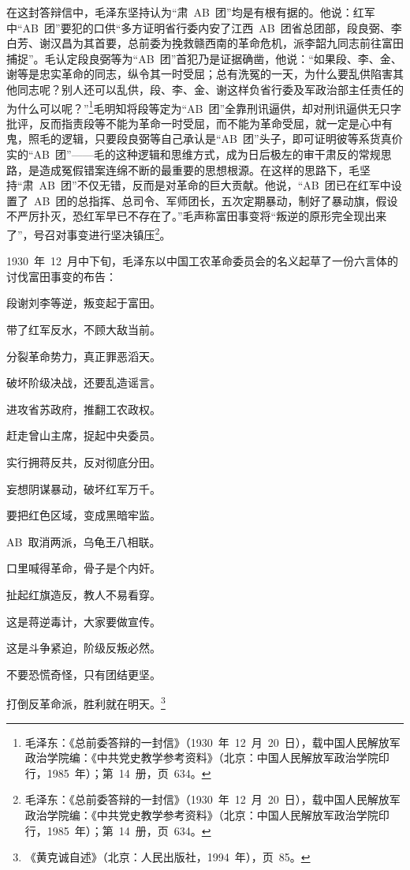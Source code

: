 在这封答辩信中，毛泽东坚持认为“肃~AB~团”均是有根有据的。他说：红军中“AB~团”要犯的口供“多方证明省行委内安了江西~AB~团省总团部，段良弼、李白芳、谢汉昌为其首要，总前委为挽救赣西南的革命危机，派李韶九同志前往富田捕捉”。毛认定段良弼等为“AB~团”首犯乃是证据确凿，他说：“如果段、李、金、谢等是忠实革命的同志，纵令其一时受屈；总有洗冤的一天，为什么要乱供陷害其他同志呢？别人还可以乱供，段、李、金、谢这样负省行委及军政治部主任责任的为什么可以呢？”\footnote{毛泽东：《总前委答辩的一封信》（1930~年~12~月~20~日），载中国人民解放军政治学院编：《中共党史教学参考资料》（北京：中国人民解放军政治学院印行，1985~年）；第~14~册，页~634。}毛明知将段等定为“AB~团”全靠刑讯逼供，却对刑讯逼供无只字批评，反而指责段等不能为革命一时受屈，而不能为革命受屈，就一定是心中有鬼，照毛的逻辑，只要段良弼等自己承认是“AB~团”头子，即可证明彼等系货真价实的“AB~团”——毛的这种逻辑和思维方式，成为日后极左的审干肃反的常规思路，是造成冤假错案连绵不断的最重要的思想根源。在这样的思路下，毛坚持“肃~AB~团”不仅无错，反而是对革命的巨大贡献。他说，“AB~团已在红军中设置了~AB~团的总指挥、总司令、军师团长，五次定期暴动，制好了暴动旗，假设不严厉扑灭，恐红军早已不存在了。”毛声称富田事变将“叛逆的原形完全现出来了”，号召对事变进行坚决镇压\footnote{毛泽东：《总前委答辩的一封信》（1930~年~12~月~20~日），载中国人民解放军政治学院编：《中共党史教学参考资料》（北京：中国人民解放军政治学院印行，1985~年）；第~14~册，页~634。}。

1930~年~12~月中下旬，毛泽东以中国工农革命委员会的名义起草了一份六言体的讨伐富田事变的布告：

\begin{quoting}
段谢刘李等逆，叛变起于富田。

带了红军反水，不顾大敌当前。

分裂革命势力，真正罪恶滔天。

破坏阶级决战，还要乱造谣言。

进攻省苏政府，推翻工农政权。

赶走曾山主席，捉起中央委员。

实行拥蒋反共，反对彻底分田。

妄想阴谋暴动，破坏红军万千。

要把红色区域，变成黑暗牢监。

AB~取消两派，乌龟王八相联。

口里喊得革命，骨子是个内奸。

扯起红旗造反，教人不易看穿。

这是蒋逆毒计，大家要做宣传。

这是斗争紧迫，阶级反叛必然。

不要恐慌奇怪，只有团结更坚。

打倒反革命派，胜利就在明天。\footnote{《黄克诚自述》（北京：人民出版社，1994~年），页~85。}
\end{quoting}

